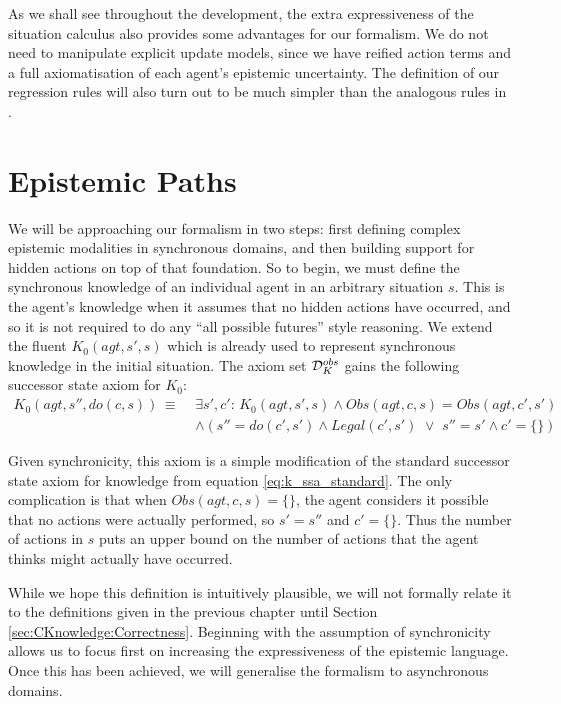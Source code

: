 As we shall see throughout the development, the extra expressiveness
of the situation calculus also provides some advantages for our formalism.
We do not need to manipulate explicit update models, since we have
reified action terms and a full axiomatisation of each agent's epistemic
uncertainty. The definition of our regression rules will also turn
out to be much simpler than the analogous rules in \citep{vanBenthem06lcc}.


\section{Epistemic Paths\label{sec:CKnowledge:Epistemic-Paths}}

We will be approaching our formalism in two steps: first defining
complex epistemic modalities in synchronous domains, and then building
support for hidden actions on top of that foundation. So to begin,
we must define the synchronous knowledge of an individual agent in
an arbitrary situation $s$. This is the agent's knowledge when it
assumes that no hidden actions have occurred, and so it is not required
to do any {}``all possible futures'' style reasoning. We extend
the fluent $K_{0}(agt,s',s)$ which is already used to represent synchronous
knowledge in the initial situation. The axiom set $\mathcal{D}_{K}^{obs}$
gains the following successor state axiom for $K_{0}$:\begin{align}
K_{0}(agt,s'',do(c,s))\,\equiv\,\, & \exists s',c':\, K_{0}(agt,s',s)\wedge Obs(agt,c,s)=Obs(agt,c',s')\nonumber \\
 & \wedge\left(s''=do(c',s')\wedge Legal(c',s')\,\,\vee\,\, s''=s'\wedge c'=\{\}\right)\label{eq:K0_ssa}\end{align}


Given synchronicity, this axiom is a simple modification of the standard
successor state axiom for knowledge from equation \eqref{eq:k_ssa_standard}.
The only complication is that when $Obs(agt,c,s)=\{\}$, the agent
considers it possible that no actions were actually performed, so
$s'=s''$ and $c'=\{\}$. Thus the number of actions in $s$ puts
an upper bound on the number of actions that the agent thinks might
actually have occurred.

While we hope this definition is intuitively plausible, we will not
formally relate it to the definitions given in the previous chapter
until Section \ref{sec:CKnowledge:Correctness}. Beginning with the
assumption of synchronicity allows us to focus first on increasing
the expressiveness of the epistemic language. Once this has been achieved,
we will generalise the formalism to asynchronous domains.


